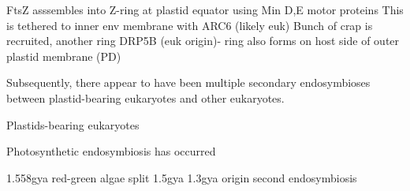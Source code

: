 FtsZ asssembles into Z-ring at plastid equator using Min D,E motor proteins 
This is tethered to inner env membrane with ARC6 (likely euk)
Bunch of crap is recruited, another ring DRP5B (euk origin)- ring also forms on host side of outer plastid membrane (PD)
\citep{McFadden2014}









Subsequently, there appear to have been multiple secondary endosymbioses between plastid-bearing eukaryotes
and other eukaryotes.






Plastids-bearing eukaryotes 






Photosynthetic endosymbiosis has occurred 




1.558gya 
red-green algae split 1.5gya
1.3gya origin second endosymbiosis \citep{Yoon2004}















